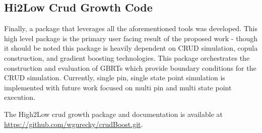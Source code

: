 \subsection{Hi2Low Crud Growth Code}

Finally, a package that leverages all the aforementioned tools was developed.  This high level package is the primary user facing result of the proposed work - though it should be noted this package is heavily dependent on CRUD simulation, copula construction, and gradient boosting technologies.
This package orchestrates the construction and evaluation of GBRTs which provide boundary conditions for the CRUD simulation.
Currently, single pin, single state point simulation is implemented with future work focused on multi pin and multi state point execution.

The High2Low crud growth package and documentation is available at \url{https://github.com/wgurecky/crudBoost.git}.
